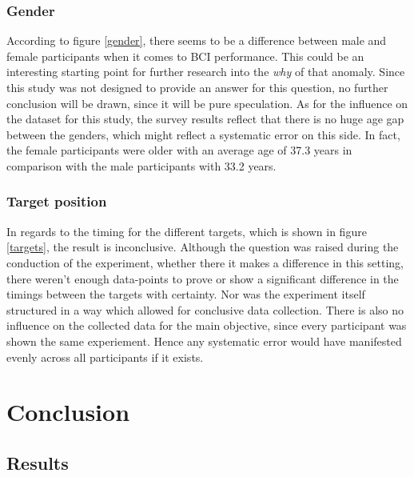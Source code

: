             \subsection{Gender}

                According to figure \ref*{gender}, there seems to be a difference between male and female participants when it comes to BCI performance. This could be an interesting starting point for further research into the \textit{why} of that anomaly. Since this study was not designed to provide an answer for this question, no further conclusion will be drawn, since it will be pure speculation. As for the influence on the dataset for this study, the survey results reflect that there is no huge age gap between the genders, which might reflect a systematic error on this side. In fact, the female participants were older with an average age of 37.3 years in comparison with the male participants with 33.2 years.

            \subsection{Target position}

                In regards to the timing for the different targets, which is shown in figure \ref*{targets}, the result is inconclusive. Although the question was raised during the conduction of the experiment, whether there it makes a difference in this setting, there weren't enough data-points to prove or show a significant difference in the timings between the targets with certainty. Nor was the experiment itself structured in a way which allowed for conclusive data collection. There is also no influence on the collected data for the main objective, since every participant was shown the same experiement. Hence any systematic error would have manifested evenly across all participants if it exists.

    \chapter{Conclusion}

        \section{Results}

